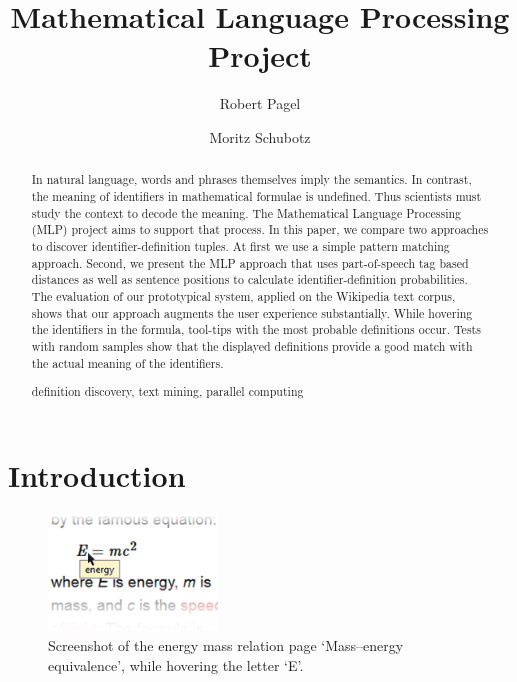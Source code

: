 \documentclass[runningheads]{llncs}
\newcommand{\keywords}[1]{\par\addvspace\baselineskip
\noindent\keywordname\enspace\ignorespaces#1}
\begin{document}
\mainmatter

\title{Mathematical Language Processing \\ Project}

\author{Robert Pagel \and Moritz Schubotz}



\maketitle


\begin{abstract}

In natural language, words and phrases themselves imply the semantics. In contrast, the meaning of identifiers in mathematical formulae is undefined.
Thus scientists must study the context to decode the meaning. The Mathematical Language Processing (MLP) project aims to support that process.  In this paper, we compare two approaches to discover identifier-definition tuples.  At first we use a simple pattern matching approach. Second, we present the 
MLP approach that uses part-of-speech  tag based distances as well as sentence positions to calculate identifier-definition probabilities. The evaluation of our prototypical system, applied on the Wikipedia text corpus, shows that our approach augments the user experience substantially. While hovering the identifiers in the formula, tool-tips with the most probable definitions occur. Tests with random samples show that the displayed definitions provide a good match with the actual meaning of the identifiers.


\keywords{definition discovery, text mining, parallel computing}
\end{abstract}


\section{Introduction}

\begin{figure}
\label{fig:screenshot}
\vspace{-20pt}
	\includegraphics[width=0.4\textwidth]{screenshot}
\caption{Screenshot of the energy mass relation page `Mass–energy equivalence', while hovering the letter `E'.}
\vspace{-20pt}
\end{figure}
\end{document}
